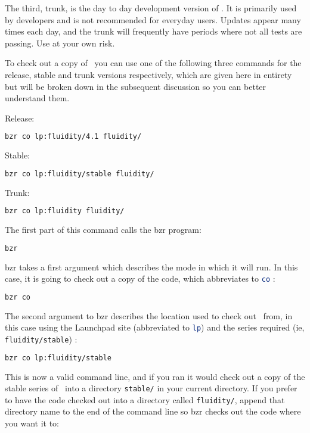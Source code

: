 The third, trunk, is the day to day development version of \fluidity. It is
primarily used by developers and is not recommended for everyday users. Updates
appear many times each day, and the trunk will frequently have periods where
not all tests are passing. Use at your own risk.

To check out a copy of \fluidity\ you can use one of the following three
commands for the release, stable and trunk versions respectively, which 
are given here in entirety but will be broken down in the subsequent 
discussion so you can better understand them.

Release:
\begin{lstlisting}[language=Bash]
bzr co lp:fluidity/4.1 fluidity/
\end{lstlisting}

Stable:
\begin{lstlisting}[language=Bash]
bzr co lp:fluidity/stable fluidity/
\end{lstlisting}

Trunk:
\begin{lstlisting}[language=Bash]
bzr co lp:fluidity fluidity/
\end{lstlisting}

The first part of this command calls the bzr program:

\begin{lstlisting}[language=Bash]
bzr
\end{lstlisting}

bzr takes a first argument which describes the mode in which it will run. In
this case, it is going to check out a copy of the code, which abbreviates to
\lstinline[language=Bash]+co+ :

\begin{lstlisting}[language=Bash]
bzr co
\end{lstlisting}

The second argument to bzr describes the location used to check out \fluidity\
from, in this case using the Launchpad site (abbreviated to
\lstinline[language=Bash]+lp+) and the series required (ie,
\lstinline[language=Bash]+fluidity/stable+) :



\begin{lstlisting}[language=Bash]
bzr co lp:fluidity/stable
\end{lstlisting}

This is now a valid command line, and if you ran it would check out a copy of
the stable series of \fluidity\ into a directory
\lstinline[language=Bash]+stable/+ in your current directory. If you
prefer to have the code checked out into a directory called
\lstinline[language=Bash]+fluidity/+, append that directory name to the end of
the command line so bzr checks out the code where you want it to:

